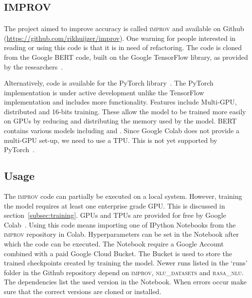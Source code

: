 \chapter{\textsc{improv}}
\label{ch:improv}
The project aimed to improve accuracy is called \textsc{improv} and available on Github (\url{https://github.com/rikhuijzer/improv}).
One warning for people interested in reading or using this code is that it is in need of refactoring.
The code is cloned from the Google BERT code, built on the Google TensorFlow library, as provided by the researchers~\citep{devlin2018github}.

Alternatively, code is available for the PyTorch library~\citep{wolf2018github}.
The PyTorch implementation is under active development unlike the TensorFlow implementation and includes more functionality.
Features include Multi-GPU, distributed and 16-bits training.
These allow the model to be trained more easily on GPUs by reducing and distributing the memory used by the model.
BERT contains various models including  and .
Since Google Colab does not provide a multi-GPU set-up, we need to use a TPU.
This is not yet supported by PyTorch~\citep{wolf2018github}.

\section{Usage}
\label{sec:improv_usage}
The \textsc{improv} code can partially be executed on a local system.
However, training the model requires at least one enterprise grade GPU.
This is discussed in section~\ref{subsec:training}.
GPUs and TPUs are provided for free by Google Colab~\citep{google2019colab}.
Using this code means importing one of IPython Notebooks from the \textsc{improv} repository in Colab.
Hyperparameters can be set in the Notebook after which the code can be executed.
The Notebook require a Google Account combined with a paid Google Cloud Bucket.
The Bucket is used to store the trained checkpoints created by training the model.
Newer runs listed in the `runs' folder in the Github repository depend on \textsc{improv}, \textsc{nlu\_datasets} and \textsc{rasa\_nlu}.
The dependencies list the used version in the Notebook.
When errors occur make sure that the correct versions are cloned or installed.

\iffalse
\section{Overview}
\label{sec:improv_overview}
Since the code is in need of refactoring this section will only describe the most important parts of the project.

\fi

